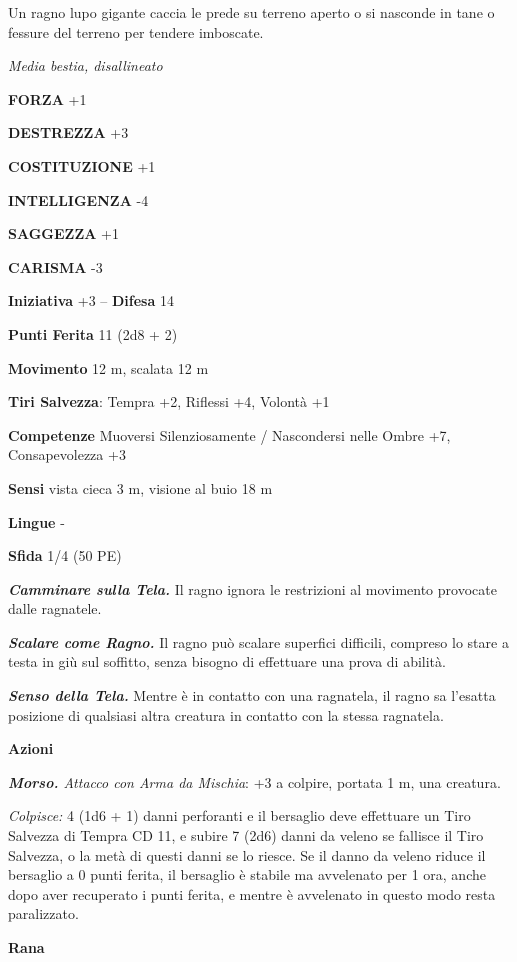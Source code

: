 \begin{multicols}{2}
Un ragno lupo gigante caccia le prede su terreno aperto o si nasconde in tane o fessure del terreno per tendere imboscate.

\emph{Media bestia, disallineato}

\textbf{FORZA} +1

\textbf{DESTREZZA} +3

\textbf{COSTITUZIONE} +1

\textbf{INTELLIGENZA} -4

\textbf{SAGGEZZA} +1

\textbf{CARISMA} -3

\textbf{Iniziativa} +3 -- \textbf{Difesa} 14

\textbf{Punti Ferita} 11 (2d8 + 2)

\textbf{Movimento} 12 m, scalata 12 m

\textbf{Tiri Salvezza}:  Tempra +2, Riflessi +4, Volontà +1 

\textbf{Competenze} Muoversi Silenziosamente / Nascondersi nelle Ombre +7, Consapevolezza +3

\textbf{Sensi} vista cieca 3 m, visione al buio 18 m

\textbf{Lingue} -

\textbf{Sfida} 1/4 (50 PE)

\emph{\textbf{Camminare sulla Tela.}} Il ragno ignora le restrizioni al movimento provocate dalle ragnatele.

\emph{\textbf{Scalare come Ragno.}} Il ragno può scalare superfici difficili, compreso lo stare a testa in giù sul soffitto, senza bisogno di effettuare una prova di abilità.

\emph{\textbf{Senso della Tela.}} Mentre è in contatto con una ragnatela, il ragno sa l'esatta posizione di qualsiasi altra creatura in contatto con la stessa ragnatela.

\textbf{Azioni}

\emph{\textbf{Morso.} Attacco con Arma da Mischia}: +3 a colpire, portata 1 m, una creatura.

\emph{Colpisce:} 4 (1d6 + 1) danni perforanti e il bersaglio deve effettuare un Tiro Salvezza di Tempra CD 11, e subire 7 (2d6) danni da veleno se fallisce il Tiro Salvezza, o la metà di questi danni se lo riesce. Se il danno da veleno riduce il bersaglio a 0 punti ferita, il bersaglio è stabile ma avvelenato per 1 ora, anche dopo aver recuperato i punti ferita, e mentre è avvelenato in questo modo resta paralizzato.

\medskip\textbf{Rana}


\end{multicols}
